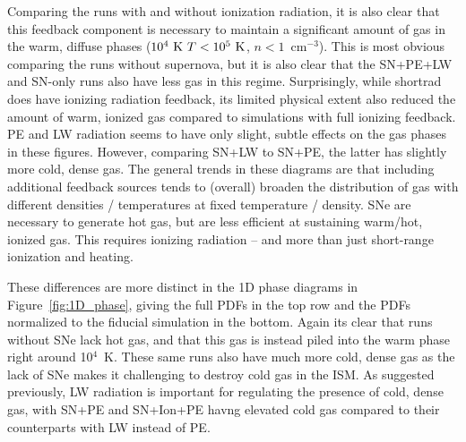 \documentclass[twocolumn]{aastex62}
\begin{document}
Comparing the runs with and without ionization radiation, it is also clear that this feedback component is necessary to maintain a significant amount of gas in the warm, diffuse phases ($10^4~ {\rm K}~ T < 10^5~ {\rm K}$, $n < 1$~cm$^{-3}$). This is most obvious comparing the runs without supernova, but it is also clear that the SN+PE+LW and SN-only runs also have less gas in this regime. Surprisingly, while shortrad does have ionizing radiation feedback, its limited physical extent also reduced the amount of warm, ionized gas compared to simulations with full ionizing feedback. PE and LW radiation seems to have only slight, subtle effects on the gas phases in these figures. However, comparing SN+LW to SN+PE, the latter has slightly more cold, dense gas. The general trends in these diagrams are that including additional feedback sources tends to (overall) broaden the distribution of gas with different densities / temperatures at fixed temperature / density. SNe are necessary to generate hot gas, but are less efficient at sustaining warm/hot, ionized gas. This requires ionizing radiation -- and more than just short-range ionization and heating.

These differences are more distinct in the 1D phase diagrams in Figure~\ref{fig:1D_phase}, giving the full PDFs in the top row and the PDFs normalized to the fiducial simulation in the bottom. Again its clear that runs without SNe lack hot gas, and that this gas is instead piled into the warm phase right around 10$^4$~K. These same runs also have much more cold, dense gas as the lack of SNe makes it challenging to destroy cold gas in the ISM. As suggested previously, LW radiation is important for regulating the presence of cold, dense gas, with SN+PE and SN+Ion+PE havng elevated cold gas compared to their counterparts with LW instead of PE.  
\end{document}
